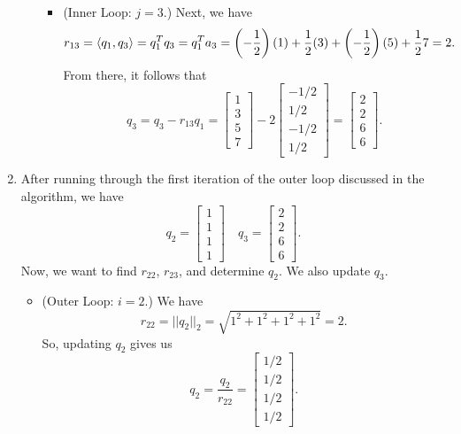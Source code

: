 \documentclass[letterpaper]{article}
\newcommand{\0}{\mathbf{0}}
\begin{document}
\begin{mdframed}
\begin{enumerate}
\begin{itemize}
\begin{itemize}
                \item (Inner Loop: $j = 3$.) Next, we have 
                \[r_{13} = \langle q_1, q_3 \rangle = q_1^T q_3 = q_1^T a_3 = \left(-\frac{1}{2}\right)(1) + \frac{1}{2}(3) + \left(-\frac{1}{2}\right)(5) + \frac{1}{2}7 = 2.\]
                From there, it follows that 
                \[q_3 = q_3 - r_{13}q_1 = \begin{bmatrix}
                    1\\3\\5\\7
                \end{bmatrix} - 2\begin{bmatrix}
                    -1/2 \\ 1/2 \\ -1/2 \\ 1/2
                \end{bmatrix} = \begin{bmatrix}
                    2 \\ 2 \\ 6 \\ 6
                \end{bmatrix}.\]
            \end{itemize}
        \end{itemize}
        
        \item After running through the first iteration of the outer loop discussed in the algorithm, we have 
        \[q_2 = \begin{bmatrix}
            1\\1\\1\\1
        \end{bmatrix} \quad q_3 = \begin{bmatrix}
            2\\2\\6\\6
        \end{bmatrix}.\] 
        Now, we want to find $r_{22}$, $r_{23}$, and determine $q_2$. We also update $q_3$. 
        \begin{itemize}
            \item (Outer Loop: $i = 2$.) We have 
            \[r_{22} = ||q_2||_2 = \sqrt{1^2 + 1^2 + 1^2 + 1^2} = 2.\]
            So, updating $q_2$ gives us 
            \[q_2 = \frac{q_2}{r_{22}} = \begin{bmatrix}
                1/2 \\ 1/2 \\ 1/2 \\ 1/2
            \end{bmatrix}.\] 


\end{itemize}
\end{enumerate}
\end{mdframed}
\end{document}
